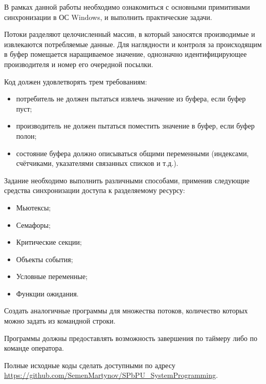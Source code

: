 \documentclass[a4paper, 12pt]{article}		%
\begin{document}
В рамках данной работы необходимо ознакомиться с основными примитивами синхронизации в ОС Windows, и выполнить практические задачи.
\vspace{2em}

Потоки разделяют целочисленный массив, в который заносятся производимые и извлекаются потребляемые данные. Для наглядности и контроля за происходящим в буфер помещается наращиваемое значение, однозначно идентифицирующее производителя и номер его очередной посылки\cite{Dushutina}.
\vspace{1em}

Код должен удовлетворять трем требованиям:
\begin{itemize}
\item потребитель не должен пытаться извлечь значение из буфера, если буфер пуст;
\item производитель не должен пытаться поместить значение в буфер, если буфер полон;
\item состояние буфера должно описываться общими переменными (индексами, счётчиками, указателями связанных списков и т.д.).
\end{itemize}
\vspace{1em}

Задание необходимо выполнить различными способами, применив следующие средства синхронизации доступа к разделяемому ресурсу:
\begin{itemize}
\item Мьютексы;
\item Семафоры;
\item Критические секции;
\item Объекты события;
\item Условные переменные;
\item Функции ожидания.
\end{itemize}

Создать аналогичные программы для множества потоков, количество которых можно задать из командной строки.

Программы должны предоставлять возможность завершения по таймеру либо по команде оператора.

Полные исходные коды сделать доступными по адресу \url{https://github.com/SemenMartynov/SPbPU_SystemProgramming}.
\vspace{3em}
\end{document}
